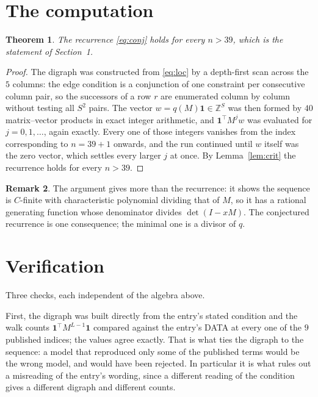 \documentclass[11pt,a4paper]{article}
\theoremstyle{plain}
\newtheorem{theorem}{Theorem}
\theoremstyle{definition}
\newtheorem{remark}[theorem]{Remark}
\begin{document}
\section{The computation}

\begin{theorem}
The recurrence \eqref{eq:conj} holds for every $n>39$, which is the statement of
Section~1.
\end{theorem}

\begin{proof}
The digraph was constructed from \eqref{eq:loc} by a depth-first scan across the $5$
columns: the edge condition is a conjunction of one constraint per consecutive column
pair, so the successors of a row $r$ are enumerated column by column without testing all
$S^2$ pairs. The vector $w=q(M)\mathbf{1}\in\mathbb{Z}^{S}$ was then formed by $40$
matrix--vector products in exact integer arithmetic, and $\mathbf{1}^{\!\top}M^{j}w$ was
evaluated for $j=0,1,\dots$, again exactly. Every one of those integers vanishes from the
index corresponding to $n=39+1$ onwards, and the run continued until $w$ itself was the
zero vector, which settles every larger $j$ at once. By Lemma~\ref{lem:crit} the recurrence
holds for every $n>39$.
\end{proof}

\begin{remark}
The argument gives more than the recurrence: it shows the sequence is $C$-finite with
characteristic polynomial dividing that of $M$, so it has a rational generating function
whose denominator divides $\det(I-xM)$. The conjectured recurrence is one consequence; the
minimal one is a divisor of $q$.
\end{remark}

\section{Verification}

Three checks, each independent of the algebra above.

First, the digraph was built directly from the entry's stated condition and the walk counts
$\mathbf{1}^{\!\top}M^{L-1}\mathbf{1}$ compared against the entry's DATA at
every one of the $9$ published indices; the values agree exactly. That is what ties
the digraph to the sequence: a model that reproduced only some of the published terms would
be the wrong model, and would have been rejected. In particular it is what rules out a
misreading of the entry's wording, since a different reading of the condition gives a
different digraph and different counts.
\end{document}
